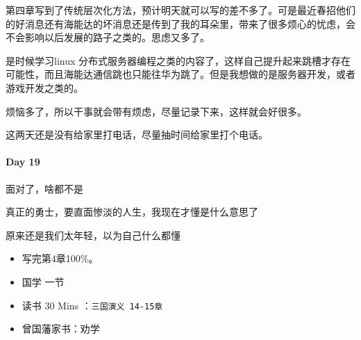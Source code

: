 \documentclass[UTF8,a4paper,8pt]{ctexart}
\begin{document}
	 	 第四章写到了传统层次化方法，预计明天就可以写的差不多了。可是最近春招他们的好消息还有海能达的坏消息还是传到了我的耳朵里，带来了很多烦心的忧虑，会不会影响以后发展的路子之类的。思虑又多了。
	 	 
	 	 是时候学习linux 分布式服务器编程之类的内容了，这样自己提升起来跳槽才存在可能性，而且海能达通信跳也只能往华为跳了。但是我想做的是服务器开发，或者游戏开发之类的。
	 	 
	 	 烦恼多了，所以干事就会带有烦虑，尽量记录下来，这样就会好很多。
	 	 
	 	 这两天还是没有给家里打电话，尽量抽时间给家里打个电话。
 	 \paragraph{Day 19      \quad     }
	 	 面对了，啥都不是
	 	 
	 	 真正的勇士，要直面惨淡的人生，我现在才懂是什么意思了
	 	 
	 	 原来还是我们太年轻，以为自己什么都懂
	 	 
	 	 \begin{itemize}[itemindent = 1em]
	 	 	\renewcommand\labelitemi{\makebox[0pt][l]{$\square$}\raisebox{.15ex}{\hspace{0.1em}$\checkmark$}}		
	 	 	
	 	 	\item    写完第4章100\%。
	 	 	
	 	 	
	 	 	\renewcommand\labelitemi{\makebox[0pt][l]{$\square$}\hspace{1em}}
	 	 	\item   国学  一节
	 	 	\item   读书  30 Mins	：\verb|三国演义 14-15章|
	 	 	\item   曾国藩家书：劝学
	 	 \end{itemize}
\end{document}
